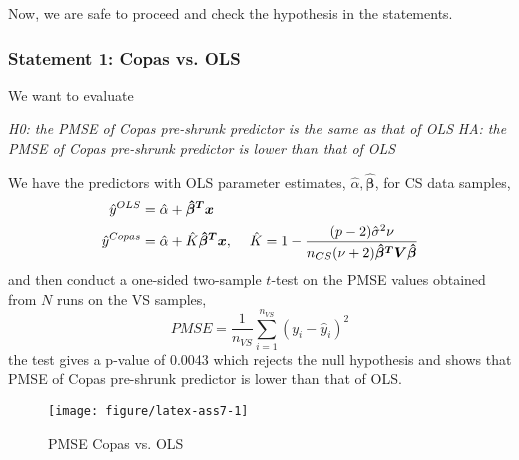\documentclass{article}\usepackage{graphicx, color}
\makeatletter
\def\maxwidth{ %
  \ifdim\Gin@nat@width>\linewidth
    \linewidth
  \else
    \Gin@nat@width
  \fi
}
\newenvironment{knitrout}{}{} %
\makeatother
\begin{document}
Now, we are safe to proceed and check the hypothesis in the statements.


\subsubsection*{Statement 1: Copas vs. OLS}
\hspace{12 pt}  We want to evaluate


\hspace{12 pt} \textit{H0: the PMSE of Copas pre-shrunk predictor is
  the same as that of OLS} \newline
\vspace{2 pt}
\hspace{24 pt} \textit{HA: the PMSE of Copas pre-shrunk predictor is
  lower than that of OLS} \newline


We have the predictors with OLS parameter estimates, $\hat{\alpha},
\bm{\hat{\beta}}$, for CS data samples,
\begin{displaymath}
\begin{split}
\hat{y}^{OLS} &= \hat{\alpha} + \bm{\hat{\beta}^Tx} \\
\hat{y}^{Copas} &= \hat{\alpha} + \hat{K}\bm{\hat{\beta}^Tx},
\hspace{12 pt} \hat{K} = 1 - \frac{(p-2)\hat{\sigma}^2\nu}{n_{CS}(\nu+2)\bm{\hat{\beta}^TV\hat{\beta}}}
\end{split}
\end{displaymath}
and then conduct a one-sided two-sample $t$-test on the PMSE values obtained
from $N$ runs on the VS samples,
\begin{displaymath}
PMSE = \frac{1}{n_{VS}} \sum_{i=1}^{n_{VS}} (y_i - \hat{y}_i)^2
\end{displaymath}
the test gives a p-value of 
0.0043
which rejects the null hypothesis and shows that PMSE of Copas
pre-shrunk predictor is lower than that of OLS.


\begin{knitrout}
\color{fgcolor}\begin{figure}[]


{\centering \texttt{[image: figure/latex-ass7-1]} 

}

\caption[PMSE Copas vs]{PMSE Copas vs. OLS\label{fig:ass7-1}}
\end{figure}


\end{knitrout}
\end{document}
